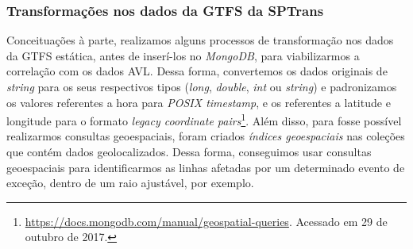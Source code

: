 \documentclass[
	12pt,				%
	oneside,			%
	a4paper,			%
	english,			%
	brazil				%
	]{abntex2ppgsi}
\begin{document}
{{{%


\clearpage

\subsubsection{Transformações nos dados da GTFS da SPTrans}

Conceituações à parte, realizamos alguns processos de transformação nos dados da GTFS estática, antes de inserí-los no \textit{MongoDB}, para viabilizarmos a correlação com os dados AVL.  Dessa forma, convertemos os dados originais de \textit{string} para os seus respectivos tipos (\textit{long}, \textit{double}, \textit{int} ou \textit{string}) e padronizamos os valores referentes a hora para \textit{POSIX timestamp}, e os referentes a latitude e longitude para o formato \textit{legacy coordinate pairs}\footnote{\label{geoMongo}\url{https://docs.mongodb.com/manual/geospatial-queries}. Acessado em 29 de outubro de 2017.}. Além disso,  para fosse possível realizarmos consultas geoespaciais, foram criados \textit{índices geoespaciais} nas coleções que contém dados geolocalizados. Dessa forma, conseguimos usar consultas geoespaciais para identificarmos as linhas afetadas por um determinado evento de exceção, dentro de um raio ajustável, por exemplo.

}}}
\end{document}

